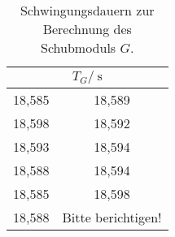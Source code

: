 \begin{table}[H]
	\centering
	\begin{tabular}{cc}
	\toprule
	\multicolumn{2}{c}{$T_G/\:\si{\second}$}\\
	\midrule
		18,585 & 18,589\\
		18,598 & 18,592\\
		18,593 & 18,594\\
		18,588 & 18,594\\
		18,585 & 18,598\\
		18,588 & {Bitte berichtigen!}\\
	\bottomrule
	\end{tabular}
	\caption{Schwingungsdauern zur Berechnung des Schubmoduls $G$.}
	\label{tab:T_G}
\end{table}
